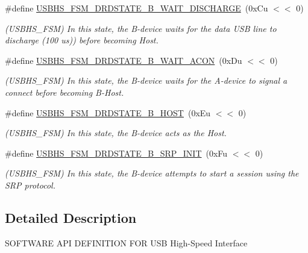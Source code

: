 \begin{DoxyCompactItemize}
\mbox{\label{group__SAMV71__USBHS_ga0e527095a2da0a240485373035325de7}} 
\#define \mbox{\hyperlink{group__SAMV71__USBHS_ga0e527095a2da0a240485373035325de7}{U\+S\+B\+H\+S\+\_\+\+F\+S\+M\+\_\+\+D\+R\+D\+S\+T\+A\+T\+E\+\_\+\+B\+\_\+\+W\+A\+I\+T\+\_\+\+D\+I\+S\+C\+H\+A\+R\+GE}}~(0x\+Cu $<$$<$ 0)
\begin{DoxyCompactList}\small\item\em (U\+S\+B\+H\+S\+\_\+\+F\+SM) In this state, the B-\/device waits for the data U\+SB line to discharge (100 us)) before becoming Host. \end{DoxyCompactList}\item 
\mbox{\label{group__SAMV71__USBHS_gae56d9bf36ddba24694d0da715511b79c}} 
\#define \mbox{\hyperlink{group__SAMV71__USBHS_gae56d9bf36ddba24694d0da715511b79c}{U\+S\+B\+H\+S\+\_\+\+F\+S\+M\+\_\+\+D\+R\+D\+S\+T\+A\+T\+E\+\_\+\+B\+\_\+\+W\+A\+I\+T\+\_\+\+A\+C\+ON}}~(0x\+Du $<$$<$ 0)
\begin{DoxyCompactList}\small\item\em (U\+S\+B\+H\+S\+\_\+\+F\+SM) In this state, the B-\/device waits for the A-\/device to signal a connect before becoming B-\/\+Host. \end{DoxyCompactList}\item 
\mbox{\label{group__SAMV71__USBHS_ga465094e34f02a30e398274d74b56488f}} 
\#define \mbox{\hyperlink{group__SAMV71__USBHS_ga465094e34f02a30e398274d74b56488f}{U\+S\+B\+H\+S\+\_\+\+F\+S\+M\+\_\+\+D\+R\+D\+S\+T\+A\+T\+E\+\_\+\+B\+\_\+\+H\+O\+ST}}~(0x\+Eu $<$$<$ 0)
\begin{DoxyCompactList}\small\item\em (U\+S\+B\+H\+S\+\_\+\+F\+SM) In this state, the B-\/device acts as the Host. \end{DoxyCompactList}\item 
\mbox{\label{group__SAMV71__USBHS_gae7e6ef19a56b988eb5efe18d07f2a0b9}} 
\#define \mbox{\hyperlink{group__SAMV71__USBHS_gae7e6ef19a56b988eb5efe18d07f2a0b9}{U\+S\+B\+H\+S\+\_\+\+F\+S\+M\+\_\+\+D\+R\+D\+S\+T\+A\+T\+E\+\_\+\+B\+\_\+\+S\+R\+P\+\_\+\+I\+N\+IT}}~(0x\+Fu $<$$<$ 0)
\begin{DoxyCompactList}\small\item\em (U\+S\+B\+H\+S\+\_\+\+F\+SM) In this state, the B-\/device attempts to start a session using the S\+RP protocol. \end{DoxyCompactList}\end{DoxyCompactItemize}


\subsection{Detailed Description}
S\+O\+F\+T\+W\+A\+RE A\+PI D\+E\+F\+I\+N\+I\+T\+I\+ON F\+OR U\+SB High-\/\+Speed Interface 